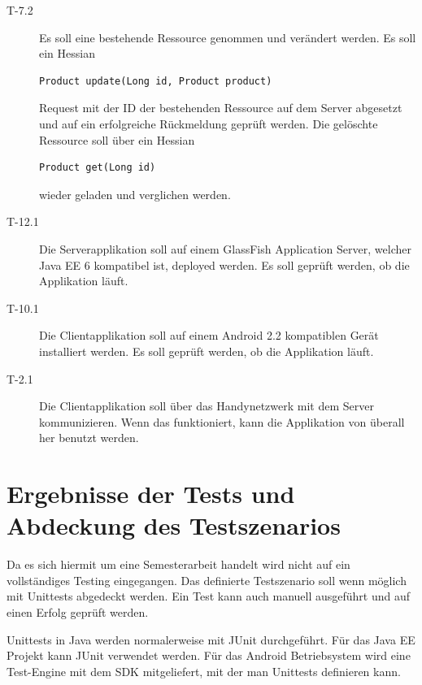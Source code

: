 \documentclass[abstracton, listof=totocnumbered,
bibliography=totocnumbered]{scrreprt}
\begin{document}
\begin{description}
    \item[T-7.2] Es soll eine bestehende Ressource genommen und
    verändert werden. Es soll ein Hessian 
    \begin{verbatim}Product update(Long id, Product product)\end{verbatim}
    Request mit der ID der bestehenden Ressource auf dem Server abgesetzt und
    auf ein erfolgreiche Rückmeldung geprüft werden. Die gelöschte Ressource
    soll über ein Hessian
    \begin{verbatim}Product get(Long id)\end{verbatim} 
    wieder geladen und verglichen werden.
    \newline
    
    \item[T-12.1] Die Serverapplikation soll auf einem GlassFish Application
    Server, welcher Java EE 6 kompatibel ist, deployed werden. Es soll geprüft
    werden, ob die Applikation läuft.
    \newline
         
    \item[T-10.1] Die Clientapplikation soll auf einem Android 2.2
    kompatiblen Gerät installiert werden. Es soll geprüft werden, ob die
    Applikation läuft.
    \newline
    
    \item[T-2.1] Die Clientapplikation soll über das Handynetzwerk mit dem
    Server kommunizieren. Wenn das funktioniert, kann die Applikation von
    überall her benutzt werden.
    
  \end{description}
  
  \newpage
  
  \chapter{Ergebnisse der Tests und Abdeckung des Testszenarios}
  
  Da es sich hiermit um eine Semesterarbeit handelt wird nicht auf ein
  vollständiges Testing eingegangen. Das definierte Testszenario soll wenn
  möglich mit Unittests abgedeckt werden. Ein Test kann auch manuell ausgeführt
  und auf einen Erfolg geprüft werden.
  
  Unittests in Java werden normalerweise mit JUnit durchgeführt. Für das Java
  EE Projekt kann JUnit verwendet werden. Für das Android Betriebsystem wird
  eine Test-Engine mit dem SDK mitgeliefert, mit der man Unittests definieren kann.
  
\end{document}

